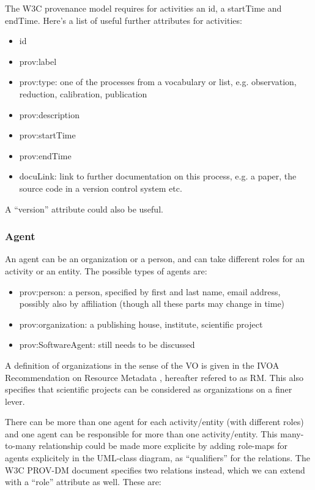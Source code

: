 \documentclass[11pt,a4paper]{ivoa}
\begin{document}
The W3C provenance model requires for activities an id, a startTime and endTime. 
Here's a list of useful further attributes for activities:

\begin{itemize}
\item id
\item prov:label
\item prov:type: one of the processes from a vocabulary or list, e.g. observation, reduction, calibration, publication
\item prov:description
\item prov:startTime
\item prov:endTime
\item docuLink: link to further documentation on this process, e.g. a paper, the source code in a version control system etc.
\end{itemize}

A ``version'' attribute could also be useful.



\subsubsection{Agent}\label{sec:w3c-agent}
An agent can be an organization or a person, and can take different roles for an activity or an entity. The possible types of agents are:
\begin{itemize}
\item prov:person: a person, specified by first and last name, email address, possibly also by affiliation (though all these parts may change in time)
\item prov:organization: a publishing house, institute, scientific project
\item prov:SoftwareAgent: still needs to be discussed
\end{itemize}

A definition of organizations in the sense of the VO is given in the IVOA Recommendation on Resource Metadata \citep{std:ResourceMeta}, hereafter refered to as RM. This also specifies that scientific projects can be considered as organizations on a finer lever.

There can be more than one agent for each activity/entity (with different roles) and one agent can be responsible for more than one activity/entity. This many-to-many relationship could be made more explicite by adding role-maps for agents explicitely in the UML-class diagram, as ``qualifiers'' for the relations. The W3C PROV-DM document specifies two relations instead, which we can extend with a ``role'' attribute as well. These are:
\end{document}
